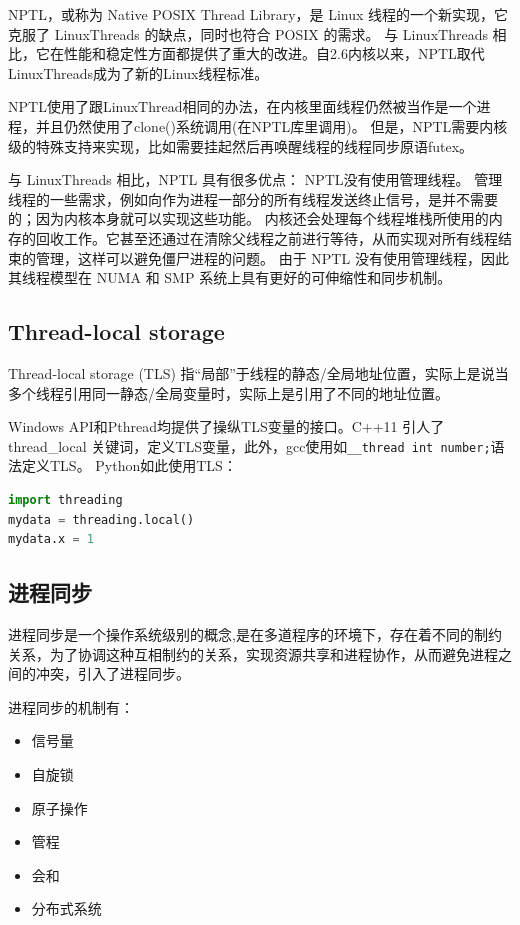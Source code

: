 NPTL，或称为 Native POSIX Thread Library，是 Linux 线程的一个新实现，它克服了 LinuxThreads 的缺点，同时也符合 POSIX 的需求。
与 LinuxThreads 相比，它在性能和稳定性方面都提供了重大的改进。自2.6内核以来，NPTL取代LinuxThreads成为了新的Linux线程标准。

NPTL使用了跟LinuxThread相同的办法，在内核里面线程仍然被当作是一个进程，并且仍然使用了clone()系统调用(在NPTL库里调用)。
但是，NPTL需要内核级的特殊支持来实现，比如需要挂起然后再唤醒线程的线程同步原语futex。

与 LinuxThreads 相比，NPTL 具有很多优点： NPTL没有使用管理线程。
管理线程的一些需求，例如向作为进程一部分的所有线程发送终止信号，是并不需要的；因为内核本身就可以实现这些功能。
内核还会处理每个线程堆栈所使用的内存的回收工作。它甚至还通过在清除父线程之前进行等待，从而实现对所有线程结束的管理，这样可以避免僵尸进程的问题。
由于 NPTL 没有使用管理线程，因此其线程模型在 NUMA 和 SMP 系统上具有更好的可伸缩性和同步机制。

\subsection{Thread-local storage}
Thread-local storage (TLS) 指“局部”于线程的静态/全局地址位置，实际上是说当多个线程引用同一静态/全局变量时，实际上是引用了不同的地址位置。

Windows API和Pthread均提供了操纵TLS变量的接口。C++11 引人了thread\_local 关键词，定义TLS变量，此外，gcc使用如\verb$__thread int number;$语法定义TLS。
Python如此使用TLS：

\begin{lstlisting}[language=Python]
import threading
mydata = threading.local()
mydata.x = 1
\end{lstlisting}

\subsection{进程同步}
进程同步是一个操作系统级别的概念,是在多道程序的环境下，存在着不同的制约关系，为了协调这种互相制约的关系，实现资源共享和进程协作，从而避免进程之间的冲突，引入了进程同步。

进程同步的机制有：
\begin{itemize}
\item 信号量
\item 自旋锁
\item 原子操作
\item 管程
\item 会和
\item 分布式系统
\end{itemize}

